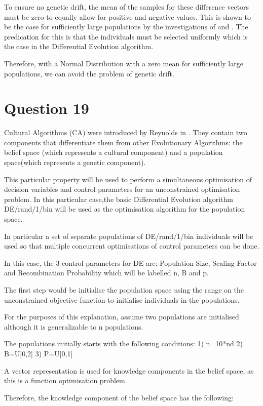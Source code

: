 \documentclass[12pt]{article}
\begin{document}
To ensure no genetic drift, the mean of the samples for these difference vectors must be zero to equally allow for positive and negative values. This is shown to be the case for sufficiently large populations by the investigations of \cite{price1997} and \cite{cruz_willigenburg_straten_2003}. The predication for this is that the individuals must be selected uniformly which is the case in the Differential Evolution algorithm.

Therefore, with a Normal Distribution with a zero mean for sufficiently large populations, we can avoid the problem of genetic drift. 
\section{Question 19}
Cultural Algorithms (CA) were introduced by Reynolds in \cite{reynolds:1994:ica}. They contain two components that differentiate them from other Evolutionary Algorithms: the belief space (which represents a cultural component) and a population space(which represents a genetic component).

This particular property will be used to perform a simultaneous optimisation of decision variables and control parameters for an unconstrained optimisation problem. In this particular case,the basic Differential Evolution algorithm DE/rand/1/bin will be used as the optimisation algorithm for the population space.

In particular a set of separate populations of DE/rand/1/bin individuals will be used so that multiple concurrent optimisations of control parameters can be done.

In this case, the 3 control parameters for DE are: Population Size, Scaling Factor and Recombination Probability which will be labelled n, B and p.

The first step would be initialise the population space using the range on the unconstrained objective function to initialise individuals in the populations.

For the purposes of this explanation, assume two populations are initialised although it is generalizable to n populations.

The populations initially starts with the following conditions:
	1) n=10*nd
	2) B=U[0,2]
	3) P=U[0,1]

A vector representation is used for knowledge components in the belief space, as this is a function optimisation problem.	

Therefore, the knowledge component of the belief space has the following:
\end{document}
